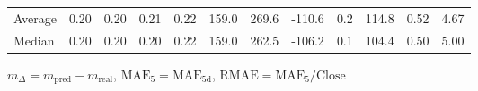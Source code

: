 \begin{threeparttable}
{\begin{tabular}{lrrrrrrrrrrr}
Average &          0.20 &          0.20 &          0.21 &        0.22 &               159.0 &               269.6 &     -110.6 &                 0.2 &            114.8 &            0.52 &                   4.67 \\
 Median &          0.20 &          0.20 &          0.20 &        0.22 &               159.0 &               262.5 &     -106.2 &                 0.1 &            104.4 &            0.50 &                   5.00 \\
\bottomrule
\end{tabular}
}
\begin{tablenotes}\footnotesize
\item $m_\Delta=m_{\text{pred}}-m_{\text{real}}$,
$\mathrm{MAE}_5=\mathrm{MAE}_{5\text{d}}$,
$\mathrm{RMAE}=\mathrm{MAE}_5/\text{Close}$
\end{tablenotes}
\end{threeparttable}
\endgroup

